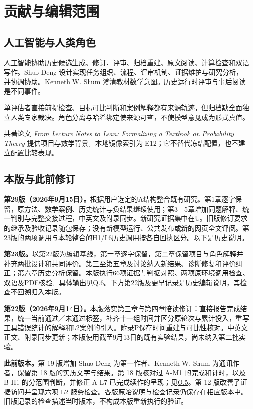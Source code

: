 \section[贡献与编辑范围]{\texorpdfstring{\protect\hypertarget{appendix-f}{}贡献与编辑范围}{贡献与编辑范围}}
\subsection[人工智能与人类角色]{\texorpdfstring{\protect\hypertarget{f1}{}人工智能与人类角色}{人工智能与人类角色}}
人工智能协助历史候选生成、修订、评审、归档重建、原文阅读、计算检查和双语写作。Shuo Deng 设计实现任务组织、流程、评审机制、证据维护与研究分析，并协调协助。Kenneth W. Shum 澄清教材数学意图。历史运行时评审与事后阅读是不同事件。

单评估者直接前提检查、目标可比判断和案例解释都有来源轨迹，但归档缺全面独立人类专家裁决。角色分离与哈希绑定使来源可查，不使模型意见成为形式真值。

共著论文 \emph{From Lecture Notes to Lean: Formalizing a Textbook on Probability Theory} 提供项目与数学背景，本地镜像索引为 E12；它不替代冻结配置，也不建立配置比较表现。

\subsection[本版与此前修订]{\texorpdfstring{\protect\hypertarget{f2}{}本版与此前修订}{本版与此前修订}}
\textbf{第29版（2026年9月15日）。}根据用户选定的A结构整合既有研究。第1章逐字保留，原方法、数学案例、历史统计与负结果继续使用；第3—5章增加同题解释、统一判别与完整交接过程，中英文及附录同步。新研究证据集中在U。旧版修订要求的继承及验收记录随包保存；没有新模型运行、公共发布或新的网页全文评阅。第23版的两项调用与本轮整合的H1/L6历史调用按各自回执区分。以下是历史说明。

\textbf{第23版。}以第22版为编辑基线，第一章逐字保留，第二章保留项目与角色解释并补充两批设计和共同评价。第三至第五章及讨论纳入新结果、诊断修复和评价纠正；第六章历史分析保留。本版执行66项证据与判据对照、两项原环境调用检查、双语及PDF核验。具体输出见Q.6。下方第22版及更早记录是历史编辑说明，其检查不回溯归入本版。

\textbf{第22版（2026年9月14日）。}本版落实第三章与第四章陪读修订：直接报告完成结果，统一当前通过／未通过标签，补齐十一组时间并区分原轮次与累计投入，重写工具错误统计的解释和L2案例的引入。附录P保存时间重建与可比性核对。中英文正文、附录同步更新；本版使用截至9月13日的既有实验结果，尚未纳入第二批实验。

\textbf{此前版本。}第 19 版增加 Shuo Deng 为第一作者、Kenneth W. Shum 为通讯作者，保留第 18 版的实质文字与结果。第 18 版核对过 A-M1 的完成和计时，以及 B-H1 的分范围判断，并修正 A-L7 已完成续作的呈现；见\hyperlink{o5}{O.5}。第 12 版改善了证据访问并呈现六项 L2 服务检查。各版原始说明与检查记录仍保存在相应版本中。旧版记录的检查描述当时版本，不构成本版重新执行的验证。

